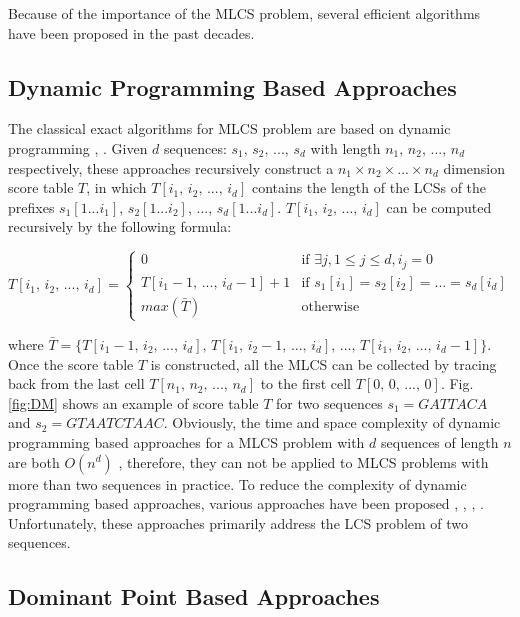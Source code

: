 \documentclass{article}
\begin{document}
Because of the importance of the MLCS problem, several efficient
algorithms have been proposed in the past decades.

\subsection{Dynamic Programming Based Approaches}
\label{sec:Dynamic Programming}

The classical exact algorithms for MLCS problem are based on dynamic
programming \cite{Smith1981}, \cite{Sankoff1972}. Given $d$ sequences:
$s_1,\, s_2,\,...,\, s_d$ with length $n_1,\, n_2,\, ...,\, n_d$
respectively, these approaches recursively construct a
$n_1 \times n_2 \times ... \times n_d$ dimension score table $T$, in
which $T[i_1,\, i_2,\, ...,\, i_d]$ contains the length of the LCSs of
the prefixes $s_1[1...i_1]$, $s_2[1...i_2]$, ..., $s_d[1...i_d]$.
$T[i_1,\, i_2,\, ...,\, i_d]$ can be computed recursively by the
following formula:

\begin{equation*}
  T[i_1,\, i_2,\, ...,\, i_d] = 
  \begin{cases}
    0 & \text{if $\exists j, 1 \leq j \leq d, i_j = 0$}\\
    T[i_1-1,\, ...,\, i_d-1] + 1  & \text{if $s_1[i_1] = s_2[i_2] =
      ... = s_d[i_d]$}\\
    max(\bar{T}) & \text{otherwise}
  \end{cases}
\end{equation*}

where $\bar{T} = \{T[i_1-1,\, i_2,\, ...,\, i_d],\, T[i_1,\, i_2-1,\,
...,\, i_d],\, ...,\, T[i_1,\, i_2,\, ...,\, i_d-1]\}$. Once the score
table $T$ is constructed, all the MLCS can be collected by tracing
back from the last cell $T[n_1,\, n_2,\, ...,\, n_d]$ to the first
cell $T[0,\, 0,\, ...,\, 0]$. Fig. \ref{fig:DM} shows an example of
score table $T$ for two sequences $s_1 = GATTACA$ and $s_2 =
GTAATCTAAC$.  Obviously, the time and space complexity of dynamic
programming based approaches for a MLCS problem with $d$ sequences of
length $n$ are both $O(n^d)$ \cite{Hsu1984}, therefore, they can not
be applied to MLCS problems with more than two sequences in
practice. To reduce the complexity of dynamic programming based
approaches, various approaches have been proposed
\cite{Hirschberg1977}, \cite{Apostolico1992}, \cite{Masek1980},
\cite{Rick1994}. Unfortunately, these approaches primarily address the
LCS problem of two sequences.

\subsection{Dominant Point Based Approaches}
\label{sec:Dominant Point}
\end{document}
